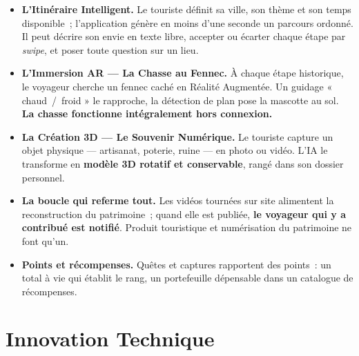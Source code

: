 \documentclass[11pt,a4paper]{article}
\newcommand{\hrulethin}{\vspace{-0.7em}\par\noindent{\color{accent}\rule{\linewidth}{0.5pt}}\par\vspace{-0.45em}}
\begin{document}
\begin{itemize}
  \item \textbf{L'Itinéraire Intelligent.} Le touriste définit sa ville, son thème et son temps disponible~; l'application génère en moins d'une seconde un parcours ordonné. Il peut décrire son envie en texte libre, accepter ou écarter chaque étape par \emph{swipe}, et poser toute question sur un lieu.
  \item \textbf{L'Immersion AR — La Chasse au Fennec.} À chaque étape historique, le voyageur cherche un fennec caché en Réalité Augmentée. Un guidage « chaud~/~froid » le rapproche, la détection de plan pose la mascotte au sol. \textbf{La chasse fonctionne intégralement hors connexion.}
  \item \textbf{La Création 3D — Le Souvenir Numérique.} Le touriste capture un objet physique — artisanat, poterie, ruine — en photo ou vidéo. L'IA le transforme en \textbf{modèle 3D rotatif et conservable}, rangé dans son dossier personnel.
  \item \textbf{La boucle qui referme tout.} Les vidéos tournées sur site alimentent la reconstruction du patrimoine~; quand elle est publiée, \textbf{le voyageur qui y a contribué est notifié}. Produit touristique et numérisation du patrimoine ne font qu'un.
  \item \textbf{Points et récompenses.} Quêtes et captures rapportent des points~: un total à vie qui établit le rang, un portefeuille dépensable dans un catalogue de récompenses.
\end{itemize}

\section{Innovation Technique}\hrulethin
\end{document}
